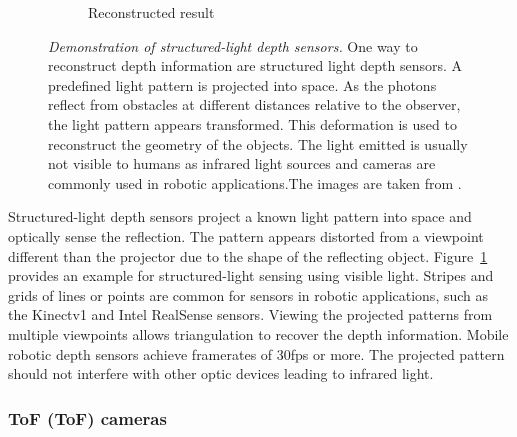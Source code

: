 \begin{figure}[H]
\begin{subfigure}[t]{0.45\textwidth}
        \caption{Reconstructed result}
    \end{subfigure}
    \caption[Demonstration of structured-light depth sensors]{\emph{Demonstration of structured-light depth sensors.} One way to reconstruct depth information are structured light depth sensors. A predefined light pattern is projected into space. As the photons reflect from obstacles at different distances relative to the observer, the light pattern appears transformed. This deformation is used to reconstruct the geometry of the objects. The light emitted is usually not visible to humans as infrared light sources and cameras are commonly used in robotic applications.The images are taken from \cite{sl_depthsensor_calibration}.}\label{fig:sl_face}
\end{figure}
Structured-light depth sensors project a known light pattern into space and optically sense the reflection.
The pattern appears distorted from a viewpoint different than the projector due to the shape of the reflecting object.
Figure~\ref{fig:sl_face} provides an example for structured-light sensing using visible light.
Stripes and grids of lines or points are common for sensors in robotic applications, such as the Kinectv1 and Intel RealSense\cite{intel_realsense} sensors.
Viewing the projected patterns from multiple viewpoints allows triangulation to recover the depth information.
Mobile robotic depth sensors achieve framerates of 30\acrshort{fps} or more.
The projected pattern should not interfere with other optic devices leading to infrared light.

\subsubsection{\acrlong{ToF} (\acrshort{ToF}) cameras}

